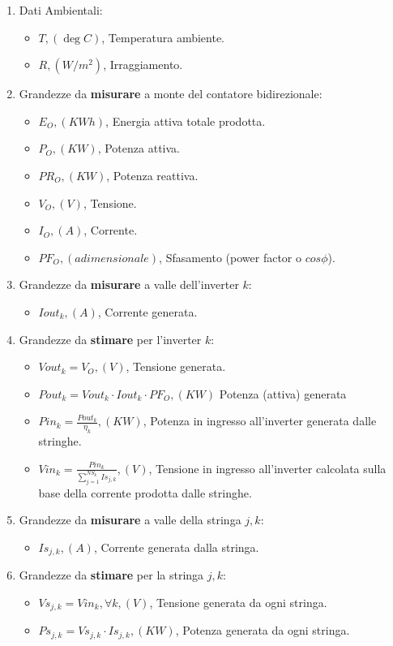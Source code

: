 \begin{enumerate}
\item Dati Ambientali:
\begin{itemize}
\item $T, (\deg C)$, Temperatura ambiente.
\item $R, (W/m^2)$, Irraggiamento.
\end{itemize}
\item Grandezze da \textbf{misurare} a monte del contatore bidirezionale:
\begin{itemize}
\item$E_O, (KWh)$, Energia attiva totale prodotta.
\item$P_O, (KW)$, Potenza attiva.
\item$PR_O, (KW)$, Potenza reattiva.
\item$V_O, (V)$, Tensione.
\item$I_O, (A)$, Corrente.
\item$PF_O, (adimensionale)$, Sfasamento (power factor o $cos \phi$).
\end{itemize}
\item Grandezze da \textbf{misurare} a valle dell'inverter $k$:
\begin{itemize}
\item$Iout_{k}, (A)$, Corrente generata.
\end{itemize}
\item Grandezze da \textbf{stimare} per l'inverter $k$:
\begin{itemize}
\item$Vout_{k} = V_O, (V)$, Tensione generata.
\item$Pout_{k} = Vout_{k} \cdot Iout_{k}  \cdot PF_O, (KW)$ Potenza
  (attiva) generata
\item$Pin_{k} = \frac{Pout_k}{\eta _k}, (KW)$, Potenza in ingresso
  all'inverter generata dalle stringhe.
\item$Vin_{k} = \frac{Pin_k}{\sum_{j=1}^{NS_k}{Is_{j, k}}}, (V)$, Tensione
  in ingresso all'inverter
  calcolata sulla base della corrente prodotta dalle stringhe.
\end{itemize}
\item Grandezze da \textbf{misurare} a valle della stringa $j, k$:
\begin{itemize}
\item$Is_{j, k}, (A)$, Corrente generata dalla stringa.
\end{itemize}
\item Grandezze da \textbf{stimare} per la stringa $j, k$:
\begin{itemize}
\item$Vs_{j, k} = Vin_{k}, \forall k, (V)$, Tensione generata da ogni stringa.
\item$Ps_{j, k} = Vs_{j,k} \cdot Is_{j,k}, (KW)$, Potenza generata da ogni
  stringa.
\end{itemize}
\end{enumerate}
%

